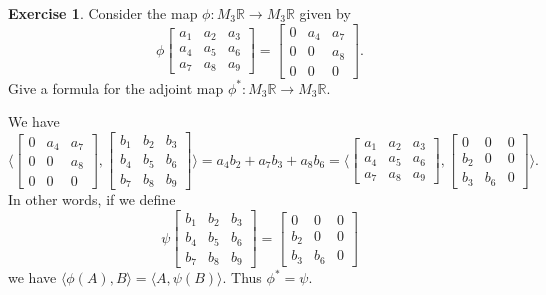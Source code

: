 \documentclass{amsart}
\newcommand{\R}         {{\mathbb{R}}}
\newcommand{\bsm}       {\left[\begin{smallmatrix}}
\newcommand{\esm}       {\end{smallmatrix}\right]}
\newcommand{\ip}[1]     {\langle #1\rangle}
\renewcommand{\:}       {\colon}
\theoremstyle{definition}
\newtheorem{exercise}{Exercise}[section]
\renewenvironment{solution}{\SolutionAtEnd}{\endSolutionAtEnd}
\begin{document}
\begin{exercise}
 Consider the map $\phi\:M_3\R\to M_3\R$ given by 
 \[ \phi\bsm a_1 & a_2 & a_3 \\
             a_4 & a_5 & a_6 \\
             a_7 & a_8 & a_9 \esm = 
        \bsm 0   & a_4 & a_7 \\
             0   & 0   & a_8 \\
             0   & 0   & 0   \esm.
 \]
 Give a formula for the adjoint map
 $\phi^*\:M_3\R\to M_3\R$.
\end{exercise}
\begin{solution}
 We have
 \[ \ip{\bsm 0 & a_4 & a_7 \\ 0 & 0 & a_8 \\ 0 & 0 & 0 \esm,
        \bsm b_1 & b_2 & b_3 \\ b_4 & b_5 & b_6 \\ b_7 & b_8 & b_9 \esm}
    = a_4b_2 + a_7 b_3 + a_8b_6 = 
  \ip{\bsm a_1 & a_2 & a_3 \\ a_4 & a_5 & a_6 \\ a_7 & a_8 & a_9 \esm,
      \bsm 0 & 0 & 0 \\ b_2 & 0 & 0 \\ b_3 & b_6 & 0 \esm}.
 \]
 In other words, if we define
 \[ \psi\bsm b_1 & b_2 & b_3 \\
             b_4 & b_5 & b_6 \\
             b_7 & b_8 & b_9 \esm = 
      \bsm 0 & 0 & 0 \\ b_2 & 0 & 0 \\ b_3 & b_6 & 0 \esm
 \] 
 we have $\ip{\phi(A),B}=\ip{A,\psi(B)}$.  Thus $\phi^*=\psi$. 
\end{solution}
\end{document}
